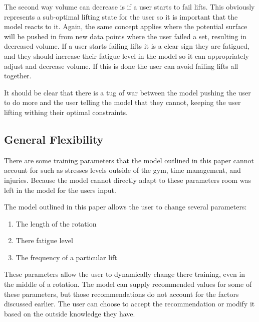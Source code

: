 The second way volume can decrease is if a user starts to fail lifts. This obviously represents a sub-optimal lifting state for the user so it is important that the model reacts to it. Again, the same concept applies where the potential surface will be pushed in from new data points where the user failed a set, resulting in decreased volume. If a user starts failing lifts it is a clear sign they are fatigued, and they should increase their fatigue level in the model so it can appropriately adjust and decrease volume. If this is done the user can avoid failing lifts all together.

It should be clear that there is a tug of war between the model pushing the user to do more and the user telling the model that they cannot, keeping the user lifting withing their optimal constraints.


\subsection{General Flexibility}
There are some training parameters that the model outlined in this paper cannot account for such as stresses levels outside of the gym, time management, and injuries. Because the model cannot directly adapt to these parameters room was left in the model for the users input.

The model outlined in this paper allows the user to change several parameters:
\begin{enumerate}
    \item The length of the rotation
    \item There fatigue level
    \item The frequency of a particular lift
\end{enumerate}

These parameters allow the user to dynamically change there training, even in the middle of a rotation. The model can supply recommended values for some of these parameters, but those recommendations do not account for the factors discussed earlier. The user can choose to accept the recommendation or modify it based on the outside knowledge they have.